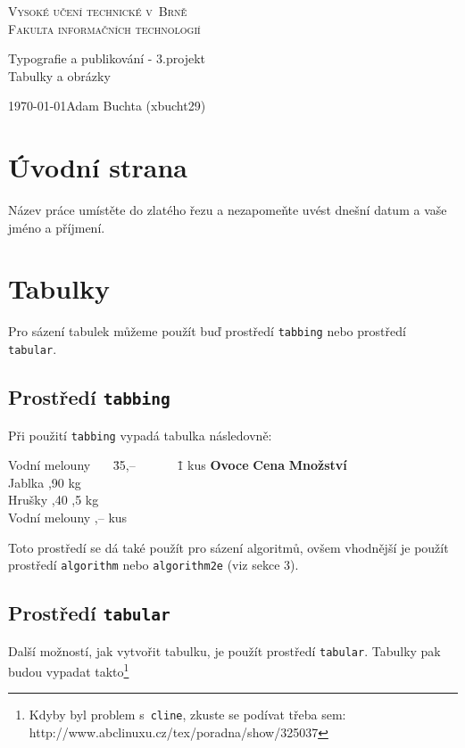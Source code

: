 \documentclass[a4paper,11pt]{article}
\begin{document}
\begin{center}
\thispagestyle{empty}
  \Huge{\textsc{Vysoké učení technické v~Brně}} \\
  \huge{\textsc{Fakulta informačních technologií}}

  \LARGE{Typografie a publikování - 3.projekt}  \\
  \Huge{Tabulky a obrázky}

\end{center}

  \Large{\today \hfill Adam Buchta (xbucht29)}
  \newpage
  \setcounter{page}{1}
  {\fontsize{11pt}{13pt}\selectfont
  \section{Úvodní strana}
  Název práce umístěte do zlatého řezu a nezapomeňte uvést dnešní datum a vaše jméno a příjmení.

  \section{Tabulky}
  Pro sázení tabulek můžeme použít buď prostředí \verb|tabbing| nebo prostředí \verb|tabular|.

  \subsection{Prostředí \texttt{tabbing}}
  Při použití \verb|tabbing| vypadá tabulka následovně:

  \begin{tabbing}
    Vodní melouny ~~~\= 35,-- ~~~~~~\= 1 kus \kill
    \textbf{Ovoce} \> \textbf{Cena} \> \textbf{Množství} \\
    Jablka ,90  kg \\
    Hrušky ,40 ,5 kg \\
    Vodní melouny ,--  kus
  \end{tabbing} \bigskip
  Toto prostředí se dá také použít pro sázení algoritmů, ovšem vhodnější je použít
  prostředí \verb|algorithm| nebo \verb|algorithm2e| (viz sekce 3).

  \subsection{Prostředí \texttt{tabular}}
  Další možností, jak vytvořit tabulku, je použít prostředí \verb|tabular|. Tabulky pak budou vypadat takto\footnote{Kdyby byl problem s~\texttt{cline}, zkuste se podívat třeba sem: http://www.abclinuxu.cz/tex/poradna/show/325037}
  \bigskip

}
\end{document}
